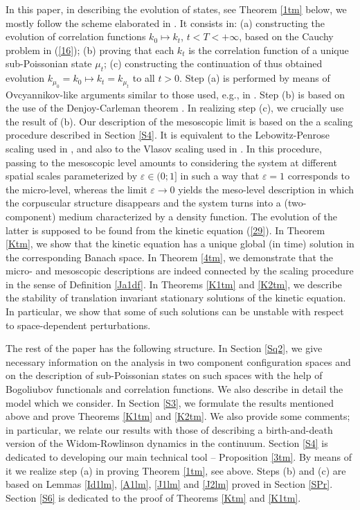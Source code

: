\documentclass[reqno,11pt]{amsart}
\theoremstyle{definition}
\theoremstyle{remark}
\numberwithin{equation}{section}
\begin{document}
In this paper, in describing the evolution of states, see Theorem
\ref{1tm} below,  we mostly follow the scheme elaborated in
\cite{KK}. It consists in: (a) constructing the evolution of
correlation functions $k_0 \mapsto k_t$, $t< T < +\infty$, based on
the Cauchy problem in (\ref{16}); (b) proving that each $k_t$ is the
correlation function of a unique sub-Poissonian state $\mu_t$; (c)
constructing the continuation of thus obtained evolution
$k_{\mu_0}=k_0 \mapsto k_t = k_{\mu_t}$ to all $t>0$. Step (a) is
performed by means of Ovcyannikov-like arguments similar to those
used, e.g., in \cite{BKKK,FKKK,FKKO}. Step (b) is based on the use
of the Denjoy-Carleman theorem \cite{DC}. In realizing step (c), we
crucially use the result of (b). Our description of the mesoscopic
limit is based on the a scaling procedure described in Section
\ref{S4}. It is equivalent to the Lebowitz-Penrose scaling used in
\cite{FKKO}, and also to the Vlasov scaling used in
\cite{BKKK,FKKK}. In this procedure, passing to the mesoscopic level
amounts to considering the system at different spatial scales
parameterized by $\varepsilon \in (0; 1]$ in such a way that
$\varepsilon = 1$ corresponds to the micro-level, whereas the limit
$\varepsilon \to 0$ yields the meso-level description in which the
corpuscular structure disappears and the system turns into a
(two-component) medium characterized by a density function. The
evolution of the latter is supposed to be found from the kinetic
equation (\ref{29}). In Theorem \ref{Ktm}, we show that the kinetic
equation has a unique global (in time) solution in the corresponding
Banach space. In Theorem \ref{4tm}, we demonstrate that the micro-
and mesoscopic descriptions are indeed connected by the scaling
procedure in the sense of Definition \ref{Ja1df}. In Theorems
\ref{K1tm} and \ref{K2tm}, we describe the stability of translation
invariant stationary solutions of the kinetic equation. In
particular, we show that some of such solutions can be unstable with
respect to space-dependent perturbations.

The rest of the paper has the following structure. In Section
\ref{Sq2}, we give necessary information on the analysis in two
component configuration spaces and on the description of
sub-Poissonian states on such spaces with the help of Bogoliubov
functionals and correlation functions. We also describe in detail
the model which we consider. In Section \ref{S3}, we formulate the
results mentioned above and prove Theorems \ref{K1tm} and
\ref{K2tm}. We also provide some comments; in particular, we relate
our results with those of \cite{FKKO} describing a birth-and-death
version of the Widom-Rowlinson dynamics in the continuum. Section
\ref{S4} is dedicated to developing our main technical tool --
Proposition \ref{3tm}. By means of it we realize step (a) in proving
Theorem \ref{1tm}, see above. Steps (b) and (c) are  based on Lemmas
\ref{Id1lm}, \ref{A1lm}, \ref{J1lm} and \ref{J2lm} proved in Section
\ref{SPr}. Section \ref{S6} is dedicated to the proof of Theorems
\ref{Ktm} and \ref{K1tm}.
\end{document}
